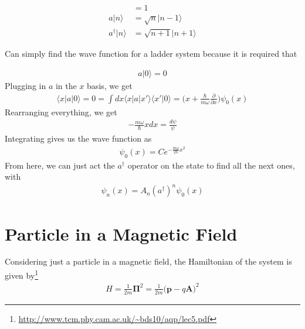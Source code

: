 \begin{align}
[a,a^\dagger] &= 1 \\
a|n\rangle &= \sqrt{n}|n-1\rangle\\
a^\dagger|n\rangle &= \sqrt{n+1}|n+1\rangle
\end{align}


Can simply find the wave function for a ladder system because it is required that

\begin{align}
a|0\rangle= 0
\end{align}
Plugging in $a$ in the $x$ basis, we get
\begin{align}
\langle x|a|0\rangle = 0 = \int dx \langle x|a|x'\rangle\langle x'|0\rangle = \Big(x + \frac{\hbar}{m\omega}\frac{\partial}{\partial x}\Big)\psi_0(x)
\end{align}
Rearranging everything, we get
\begin{align}\label{harmosc}
-\frac{m\omega}{\hbar}xdx = \frac{d\psi}{\psi}
\end{align}
Integrating gives us the wave function as
\begin{align}
\psi_0(x) = Ce^{-\frac{m\omega}{2\hbar}x^2}
\end{align}
From here, we can just act the $a^\dagger$ operator on the state to find all the next ones, with
\begin{align}
\psi_n(x) = A_n(a^\dagger)^n\psi_0(x)
\end{align}





\section{Particle in a Magnetic Field}
Considering just a particle in a magnetic field, the Hamiltonian of the system is given by\footnote{\url{http://www.tcm.phy.cam.ac.uk/~bds10/aqp/lec5.pdf}}
\begin{align}
H = \frac{1}{2m}\boldsymbol{\Pi}^2 = \frac{1}{2m}\Big(\textbf{p}-q\textbf{A}\Big)^2
\end{align}

